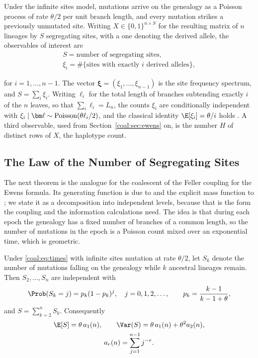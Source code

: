 Under the infinite sites model, mutations arrive on the genealogy as a Poisson process of rate $\theta/2$ per unit branch length, and every mutation strikes a previously unmutated site. Writing $X\in\{0,1\}^{n\times S}$ for the resulting matrix of $n$ lineages by $S$ segregating sites, with a one denoting the derived allele, the observables of interest are
\begin{equation}\label{coal:eq:obs}
\begin{gathered}
S = \text{number of segregating sites},\\
\xi_i = \#\{\text{sites with exactly } i \text{ derived alleles}\},
\end{gathered}
\end{equation}
\begin{sloppypar}for $i=1,\dots,n-1$. The vector $\bm{\xi}=(\xi_1,\dots,\xi_{n-1})$ is the site frequency spectrum, and $S=\sum_i\xi_i$. Writing $\ell_i$ for the total length of branches subtending exactly $i$ of the $n$ leaves, so that $\sum_i\ell_i=L_n$, the counts $\xi_i$ are conditionally independent with $\xi_i\mid \bm\ell\sim\coalPois(\theta \ell_i/2)$, and the classical identity $\E[\xi_i]=\theta/i$ holds \citep{coal:fu1995}. A third observable, used from Section~\ref{coal:sec:ewens} on, is the number $H$ of distinct rows of $X$, the haplotype count.\end{sloppypar}

\subsection{The Law of the Number of Segregating Sites}\label{coal:sec:exact}

The next theorem is the analogue for the coalescent of the Feller coupling for the Ewens formula. Its generating function is due to \citet{coal:watterson1975} and the explicit mass function to \citet{coal:tavare1984}; we state it as a decomposition into independent levels, because that is the form the coupling and the information calculations need. The idea is that during each epoch the genealogy has a fixed number of branches of a common length, so the number of mutations in the epoch is a Poisson count mixed over an exponential time, which is geometric.

\begin{theorem}\label{coal:thm:geom}
Under \eqref{coal:eq:times} with infinite sites mutation at rate $\theta/2$, let $S_k$ denote the number of mutations falling on the genealogy while $k$ ancestral lineages remain. Then $S_2,\dots,S_n$ are independent with
\begin{equation}\label{coal:eq:geom}
\Prob(S_k=j) = p_k(1-p_k)^j,\quad j=0,1,2,\dots,\qquad p_k=\frac{k-1}{k-1+\theta},
\end{equation}
and $S=\sum_{k=2}^n S_k$. Consequently
\begin{equation}\label{coal:eq:watterson}
\begin{gathered}
\E[S] = \theta\,a_1(n),\qquad \Var(S)=\theta\,a_1(n)+\theta^2 a_2(n),\\
a_r(n)=\sum_{j=1}^{n-1}j^{-r}.
\end{gathered}
\end{equation}
\end{theorem}

